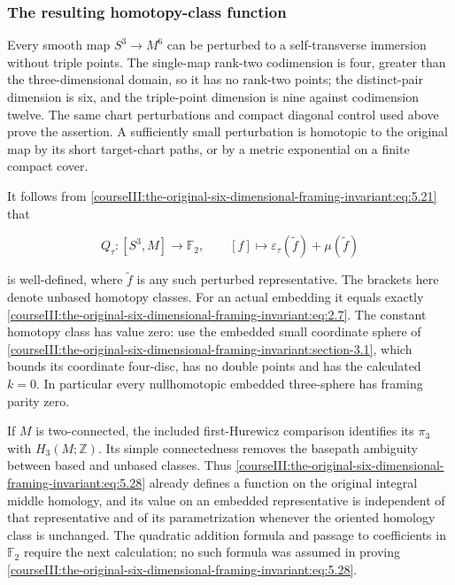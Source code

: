\subsubsection{The resulting homotopy-class function}
\label{courseIII:the-original-six-dimensional-framing-invariant:section-5.6}

Every smooth map \(S^3\to M^6\) can be perturbed to a self-transverse immersion without triple points. The single-map rank-two codimension is four, greater than the three-dimensional domain, so it has no rank-two points; the distinct-pair dimension is six, and the triple-point dimension is nine against codimension twelve. The same chart perturbations and compact diagonal control used above prove the assertion. A sufficiently small perturbation is homotopic to the original map by its short target-chart paths, or by a metric exponential on a finite compact cover.

It follows from \eqref{courseIII:the-original-six-dimensional-framing-invariant:eq:5.21} that

\begin{equation}
Q_\tau:[S^3,M]\longrightarrow\mathbb F_2,\qquad
          [f]\longmapsto \varepsilon_\tau(\widetilde f)+\mu(\widetilde f)
 \label{courseIII:the-original-six-dimensional-framing-invariant:eq:5.28}
\end{equation}

is well-defined, where \(\widetilde f\) is any such perturbed representative. The brackets here denote unbased homotopy classes. For an actual embedding it equals exactly \eqref{courseIII:the-original-six-dimensional-framing-invariant:eq:2.7}. The constant homotopy class has value zero: use the embedded small coordinate sphere of \cref{courseIII:the-original-six-dimensional-framing-invariant:section-3.1}, which bounds its coordinate four-disc, has no double points and has the calculated \(k=0\). In particular every nullhomotopic embedded three-sphere has framing parity zero.

If \(M\) is two-connected, the included first-Hurewicz comparison identifies its \(\pi_3\) with \(H_3(M;\mathbb Z)\). Its simple connectedness removes the basepath ambiguity between based and unbased classes. Thus \eqref{courseIII:the-original-six-dimensional-framing-invariant:eq:5.28} already defines a function on the original integral middle homology, and its value on an embedded representative is independent of that representative and of its parametrization whenever the oriented homology class is unchanged. The quadratic addition formula and passage to coefficients in \(\mathbb F_2\) require the next calculation; no such formula was assumed in proving \eqref{courseIII:the-original-six-dimensional-framing-invariant:eq:5.28}.

